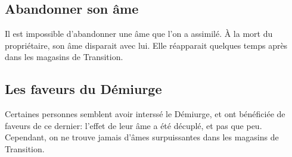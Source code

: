 \subsection{Abandonner son âme}
Il est impossible d'abandonner une âme que l'on a assimilé. À la mort du propriétaire, son âme disparait avec lui. Elle réapparait quelques temps après dans les magasins de Transition.
\subsection{Les faveurs du Démiurge}
Certaines personnes semblent avoir interssé le Démiurge, et ont bénéficiée de faveurs de ce dernier: l'effet de leur âme a été décuplé, et pas que peu. Cependant, on ne trouve jamais d'âmes surpuissantes dans les magasins de Transition.